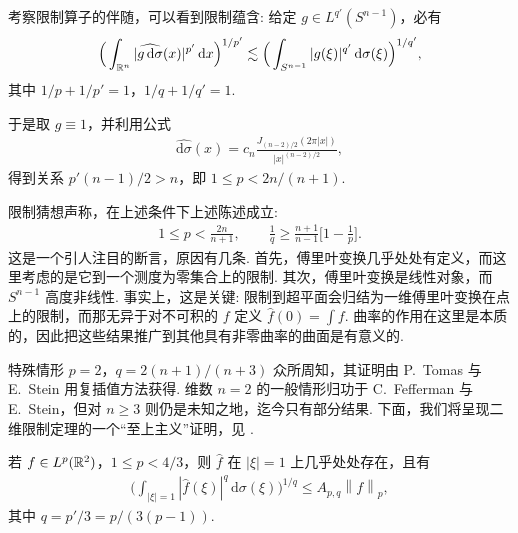考察限制算子的伴随，可以看到限制蕴含: 给定 $g \in L^{q'}(S^{n-1})$，必有
\begin{align*}
  \Big(\int_{\mathbb{R}^{n}}|\widehat{g\,\mathrm{d}\sigma}(x)|^{p'}\,\mathrm{d}x\Big)^{1/p'}
  \lesssim\Big(\int_{S^{n-1}}|g(\xi)|^{q'}\,\mathrm{d}\sigma(\xi)\Big)^{1/q'},
\end{align*}
其中 $1/p + 1/p' = 1$，$1/q + 1/q' = 1$.

于是取 $g \equiv 1$，并利用公式
\begin{align*}
  \widehat{\mathrm{d}\sigma}(x)=c_{n}\frac{J_{(n-2)/2}(2\pi|x|)}{|x|^{(n-2)/2}},
\end{align*}
得到关系 $p'(n-1)/2 > n$，即 $1 \leq p < 2n/(n+1)$.

限制猜想声称，在上述条件下上述陈述成立:
\begin{align*}
  1\leq p<\frac{2n}{n+1},\qquad
  \frac{1}{q}\geq\frac{n+1}{n-1}\Big[1-\frac{1}{p}\Big].
\end{align*}
这是一个引人注目的断言，原因有几条. 首先，傅里叶变换几乎处处有定义，而这里考虑的是它到一个测度为零集合上的限制. 其次，傅里叶变换是线性对象，而 $S^{n-1}$ 高度非线性. 事实上，这是关键: 限制到超平面会归结为一维傅里叶变换在点上的限制，而那无异于对不可积的 $f$ 定义 $\widehat{f}(0) = \int f$. 曲率的作用在这里是本质的，因此把这些结果推广到其他具有非零曲率的曲面是有意义的.

特殊情形 $p = 2$，$q = 2(n+1)/(n+3)$ 众所周知，其证明由 P.~Tomas 与 E.~Stein 用复插值方法获得. 维数 $n = 2$ 的一般情形归功于 C.~Fefferman 与 E.~Stein，但对 $n \geq 3$ 则仍是未知之地，迄今只有部分结果. 下面，我们将呈现二维限制定理的一个``至上主义''证明，见 \cite{b108}.

\begin{theorem}\label{thm:5.19}
若 $f \in L^p(\mathbb{R}^2)$，$1 \leq p < 4/3$，则 $\widehat{f}$ 在 $|\xi| = 1$ 上几乎处处存在，且有
\begin{align*}
  \Big(\int_{|\xi|=1}|\widehat{f}(\xi)|^{q}\,\mathrm{d}\sigma(\xi)\Big)^{1/q}\leq A_{p,q}\left\|f\right\|_{p},
\end{align*}
其中 $q = p'/3 = p/(3(p - 1))$.
\end{theorem}

